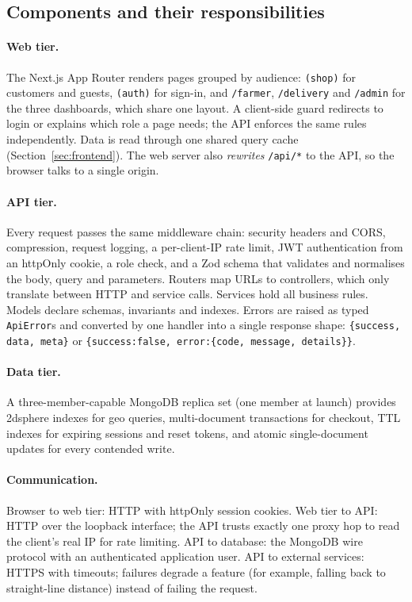 \documentclass[manuscript,screen,review]{acmart}
\begin{document}
\subsection{Components and their responsibilities}

\paragraph{Web tier.} The Next.js App Router renders pages grouped by audience: \texttt{(shop)} for customers and guests, \texttt{(auth)} for sign-in, and \texttt{/farmer}, \texttt{/delivery} and \texttt{/admin} for the three dashboards, which share one layout. A client-side guard redirects to login or explains which role a page needs; the API enforces the same rules independently. Data is read through one shared query cache (Section~\ref{sec:frontend}). The web server also \emph{rewrites} \texttt{/api/*} to the API, so the browser talks to a single origin.

\paragraph{API tier.} Every request passes the same middleware chain: security headers and CORS, compression, request logging, a per-client-IP rate limit, JWT authentication from an httpOnly cookie, a role check, and a Zod schema that validates and normalises the body, query and parameters. Routers map URLs to controllers, which only translate between HTTP and service calls. Services hold all business rules. Models declare schemas, invariants and indexes. Errors are raised as typed \texttt{ApiError}s and converted by one handler into a single response shape: \texttt{\{success, data, meta\}} or \texttt{\{success:false, error:\{code, message, details\}\}}.

\paragraph{Data tier.} A three-member-capable MongoDB replica set (one member at launch) provides 2dsphere indexes for geo queries, multi-document transactions for checkout, TTL indexes for expiring sessions and reset tokens, and atomic single-document updates for every contended write.

\paragraph{Communication.} Browser to web tier: HTTP with httpOnly session cookies. Web tier to API: HTTP over the loopback interface; the API trusts exactly one proxy hop to read the client's real IP for rate limiting. API to database: the MongoDB wire protocol with an authenticated application user. API to external services: HTTPS with timeouts; failures degrade a feature (for example, falling back to straight-line distance) instead of failing the request.
\end{document}
